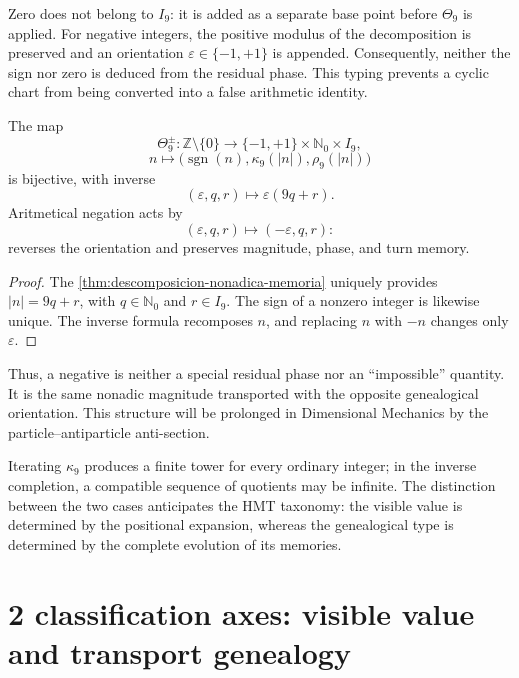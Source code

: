 Zero does not belong to \(I_9\): it is added as a separate base point before \(\Theta_9\) is applied. For negative integers, the positive modulus of the decomposition is preserved and an orientation \(\varepsilon\in\{-1,+1\}\) is appended. Consequently, neither the sign nor zero is deduced from the residual phase. This typing prevents a cyclic chart from being converted into a false arithmetic identity.

\begin{theorem}
\label{thm:entero-orientado-signo-genealogico}
The map
\[
\Theta_9^\pm:
\mathbb Z\setminus\{0\}
\longrightarrow
\{-1,+1\}\times\mathbb N_0\times I_9,
\]
\[
n\longmapsto
\bigl(\operatorname{sgn}(n),
      \kappa_9(|n|),
      \rho_9(|n|)\bigr)
\]
is bijective, with inverse
\[
(\varepsilon,q,r)\longmapsto\varepsilon(9q+r).
\]
Aritmetical negation acts by
\[
(\varepsilon,q,r)\longmapsto(-\varepsilon,q,r):
\]
reverses the orientation and preserves magnitude, phase, and turn memory.
\end{theorem}

\begin{proof}
The \cref{thm:descomposicion-nonadica-memoria} uniquely provides
\(|n|=9q+r\), with \(q\in\mathbb N_0\) and \(r\in I_9\). The sign of a nonzero
integer is likewise unique. The inverse formula recomposes \(n\), and replacing
\(n\) with \(-n\) changes only \(\varepsilon\).
\end{proof}

Thus, a negative is neither a special residual phase nor an
``impossible'' quantity. It is the same nonadic magnitude transported with the opposite
genealogical orientation. This structure will be prolonged in Dimensional Mechanics
by the particle--antiparticle anti-section.

Iterating \(\kappa_9\) produces a finite tower for every ordinary integer; in the inverse completion, a compatible sequence of quotients may be infinite. The distinction between the two cases anticipates the HMT taxonomy: the visible value is determined by the positional expansion, whereas the genealogical type is determined by the complete evolution of its memories.

\section{2 classification axes: visible value and transport genealogy}

